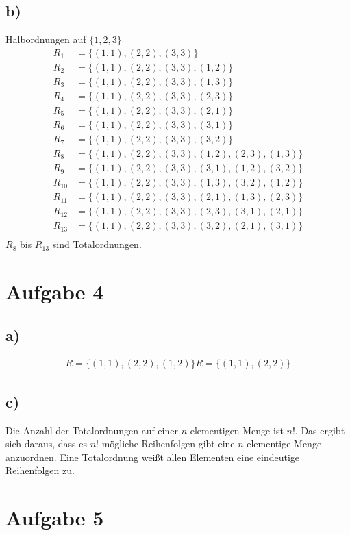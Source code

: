 \documentclass[a4paper]{scrartcl}
\begin{document}
\subsection*{b)}
Halbordnungen auf $\{1,2,3\}$
\begin{align*}
    R_1 &= \{(1,1),(2,2),(3,3)\} \\
    R_2 &= \{(1,1),(2,2),(3,3), (1,2)\} \\
    R_3 &= \{(1,1),(2,2),(3,3), (1,3)\} \\
    R_4 &= \{(1,1),(2,2),(3,3), (2,3)\} \\
    R_5 &= \{(1,1),(2,2),(3,3), (2,1)\} \\
    R_6 &= \{(1,1),(2,2),(3,3), (3,1)\} \\
    R_7 &= \{(1,1),(2,2),(3,3), (3,2)\} \\
    R_8 &= \{(1,1),(2,2),(3,3), (1,2), (2,3), (1,3)\} \\
    R_9 &= \{(1,1),(2,2),(3,3), (3,1), (1,2), (3,2)\} \\
    R_{10} &= \{(1,1),(2,2),(3,3), (1,3), (3,2), (1,2)\} \\
    R_{11} &= \{(1,1),(2,2),(3,3), (2,1), (1,3), (2,3)\} \\
    R_{12} &= \{(1,1),(2,2),(3,3), (2,3), (3,1), (2,1)\} \\
    R_{13} &= \{(1,1),(2,2),(3,3), (3,2), (2,1), (3,1)\} \\
\end{align*}
$R_8$ bis $R_{13}$ sind Totalordnungen.
\section*{Aufgabe 4}
\subsection*{a)}
\begin{align*}
    R = \{(1,1),(2,2),(1,2)\}
    R = \{(1,1),(2,2)\}
\end{align*}

\subsection*{c)}
Die Anzahl der Totalordnungen auf einer $n$ elementigen Menge ist $n!$. Das ergibt sich daraus, dass es $n!$ mögliche 
Reihenfolgen gibt eine $n$ elementige Menge anzuordnen. Eine Totalordnung weißt allen Elementen eine eindeutige Reihenfolgen zu.



\section*{Aufgabe 5}
\end{document}

